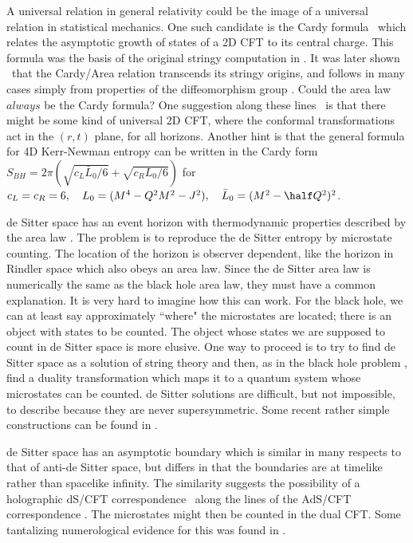  A universal relation in general relativity could be the image of a universal relation in statistical mechanics. One such candidate is the  Cardy formula \jc\ which relates the asymptotic growth of states of a 2D CFT to its central charge. This formula was the basis of the original stringy computation in \ascv.  It was later shown \nhbh\ that the 
Cardy/Area relation transcends its stringy origins, and follows in many cases simply from properties of the diffeomorphism group \jbmh.  Could the area law $always$ be the Cardy formula? One suggestion along these lines \carlip\ is that there 
might be some kind of universal 2D CFT, where the conformal transformations act in the $(r,t)$ plane, for all horizons. 
Another hint is that the general formula for 4D Kerr-Newman entropy can be written in the Cardy form
$S_{BH}=2\pi(\sqrt{c_L\bar L_0/6}+\sqrt{c_R L_0/6})$ for $c_L=c_R=6,~~~L_0=(M^4-Q^2M^2-J^2), ~~~\bar L_0=
(M^2-\half Q^2)^2$.

   de Sitter space has an event horizon with thermodynamic properties described by the area law \dft.  The problem is to reproduce the de Sitter entropy by microstate counting. The location of the horizon is observer dependent, like the horizon in Rindler space which also obeys an area law. Since the de Sitter area law is numerically the same as the black hole area law, they must have a common explanation. It is very hard to imagine how this can work. For the black hole, we can at least say approximately ``where" the microstates are located; there is an object with states to be counted.  The object whose states we are supposed to count in de Sitter space is more elusive. 
  One way to proceed is to try to find de Sitter space as a solution of string theory and then, 
 as in the black hole problem \ascv, find a duality transformation which maps it to a quantum system whose microstates can be counted. de Sitter solutions are difficult, but not impossible, to describe because they are never supersymmetric. Some recent rather simple constructions can be found in \eva. 
 
  de Sitter space has an asymptotic boundary  which is similar in many respects to that of anti-de Sitter space, but differs in that the boundaries are at timelike rather than spacelike infinity. The similarity  suggests the possibility of
a holographic dS/CFT correspondence \asds\ along the lines of the AdS/CFT correspondence . 
The microstates might then be counted in the dual CFT. Some tantalizing numerological evidence for this was found in 
\bms.

